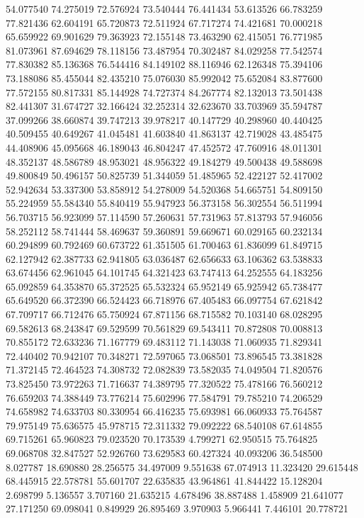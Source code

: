 54.077540
74.275019
72.576924
73.540444
76.441434
53.613526
66.783259
77.821436
62.604191
65.720873
72.511924
67.717274
74.421681
70.000218
65.659922
69.901629
79.363923
72.155148
73.463290
62.415051
76.771985
81.073961
87.694629
78.118156
73.487954
70.302487
84.029258
77.542574
77.830382
85.136368
76.544416
84.149102
88.116946
62.126348
75.394106
73.188086
85.455044
82.435210
75.076030
85.992042
75.652084
83.877600
77.572155
80.817331
85.144928
74.727374
84.267774
82.132013
73.501438
82.441307
31.674727
32.166424
32.252314
32.623670
33.703969
35.594787
37.099266
38.660874
39.747213
39.978217
40.147729
40.298960
40.440425
40.509455
40.649267
41.045481
41.603840
41.863137
42.719028
43.485475
44.408906
45.095668
46.189043
46.804247
47.452572
47.760916
48.011301
48.352137
48.586789
48.953021
48.956322
49.184279
49.500438
49.588698
49.800849
50.496157
50.825739
51.344059
51.485965
52.422127
52.417002
52.942634
53.337300
53.858912
54.278009
54.520368
54.665751
54.809150
55.224959
55.584340
55.840419
55.947923
56.373158
56.302554
56.511994
56.703715
56.923099
57.114590
57.260631
57.731963
57.813793
57.946056
58.252112
58.741444
58.469637
59.360891
59.669671
60.029165
60.232134
60.294899
60.792469
60.673722
61.351505
61.700463
61.836099
61.849715
62.127942
62.387733
62.941805
63.036487
62.656633
63.106362
63.538833
63.674456
62.961045
64.101745
64.321423
63.747413
64.252555
64.183256
65.092859
64.353870
65.372525
65.532324
65.952149
65.925942
65.738477
65.649520
66.372390
66.524423
66.718976
67.405483
66.097754
67.621842
67.709717
66.712476
65.750924
67.871156
68.715582
70.103140
68.028295
69.582613
68.243847
69.529599
70.561829
69.543411
70.872808
70.008813
70.855172
72.633236
71.167779
69.483112
71.143038
71.060935
71.829341
72.440402
70.942107
70.348271
72.597065
73.068501
73.896545
73.381828
71.372145
72.464523
74.308732
72.082839
73.582035
74.049504
71.820576
73.825450
73.972263
71.716637
74.389795
77.320522
75.478166
76.560212
76.659203
74.388449
73.776214
75.602996
77.584791
79.785210
74.206529
74.658982
74.633703
80.330954
66.416235
75.693981
66.060933
75.764587
79.975149
75.636575
45.978715
72.311332
79.092222
68.540108
67.614855
69.715261
65.960823
79.023520
70.173539
4.799271
62.950515
75.764825
69.068708
32.847527
52.926760
73.629583
60.427324
40.093206
36.548500
8.027787
18.690880
28.256575
34.497009
9.551638
67.074913
11.323420
29.615448
68.445915
22.578781
55.601707
22.635835
43.964861
41.844422
15.128204
2.698799
5.136557
3.707160
21.635215
4.678496
38.887488
1.458909
21.641077
27.171250
69.098041
0.849929
26.895469
3.970903
5.966441
7.446101
20.778721
